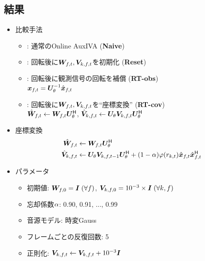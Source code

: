 \documentclass[sip,biber]{now-journal}
\begin{document}
\subsection{結果}
\begin{itemize}
  \item 比較手法
    \begin{itemize}
      \item {}: 通常のOnline AuxIVA (\textbf{Naive})
      \item {}: 回転後に$\Demix _{\ft}, \cov _{\src,\ft}$を初期化 (\textbf{Reset})
      \item {}: 回転後に観測信号の回転を補償 (\textbf{RT-obs})\\
        $\Obs _{\ft} = \rotMat _{\rotDeg} ^{-1} \rotObs _{\ft}$
      \item {}: 回転後に$\Demix _{\ft}, \cov _{\src,\ft}$を``座標変換'' (\textbf{RT-cov})\\
        $\rotDemix _{\ft} \gets \Demix _{\ft} \rotMat _{\rotDeg} ^{\hermite}$,\; $\rotCov _{\src,\ft} \gets \rotMat _{\rotDeg} \cov _{\src,\ft} \rotMat _{\rotDeg} ^{\hermite}$
    \end{itemize}
  \item 座標変換
    \begin{align*}
      \rotDemix _{\ft} &\gets \Demix _{\ft} \rotMat _{\rotDeg} ^{\hermite} \\
      \rotCov _{\src,\ft} &\gets \rotMat _{\rotDeg} \cov _{\src,\ft[-1]} \rotMat _{\rotDeg} ^{\hermite} + (1 - \forget) \weight(\var _{\src,\tframe}) \rot{\Obs} _{\ft} \rot{\Obs} _{\ft} ^{\hermite}
    \end{align*}
  \item パラメータ
    \begin{itemize}
      \item 初期値: $\bm{W} _{f,0} = \bm{I}\; (\forall f)$, $\bm{V} _{k,f,0} = 10^{-3}\times\bm{I}\; (\forall k, f)$
      \item 忘却係数$\alpha$: 0.90, 0.91, ..., 0.99
      \item 音源モデル: 時変Gauss
      \item フレームごとの反復回数: 5
      \item 正則化: $\cov _{\src,\ft} \gets \cov _{\src,\ft} + 10 ^{-3} \bm{I}$
    \end{itemize}
\end{itemize}
\end{document}
